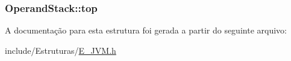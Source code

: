\subsubsection[{top}]{ Operand\+Stack\+::top}\label{struct_operand_stack_a72c72a798cbb9497d5cec0db07b29dac}


A documentação para esta estrutura foi gerada a partir do seguinte arquivo\+:\begin{DoxyCompactItemize}
\item 
include/\+Estruturas/\hyperlink{_e___j_v_m_8h}{E\+\_\+\+J\+V\+M.\+h}\end{DoxyCompactItemize}
